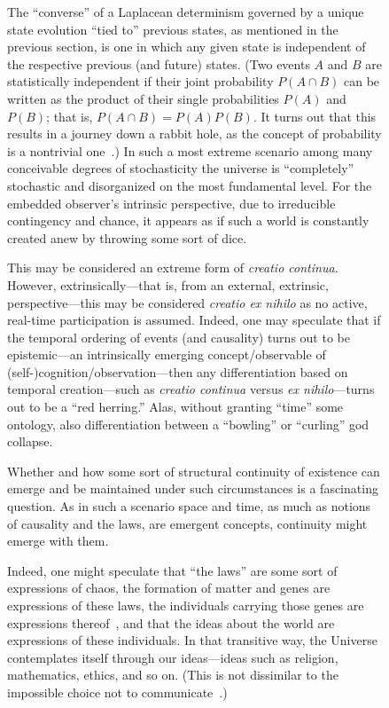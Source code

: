 \documentclass[entropy,article,accept,oneauthor,pdftex]{Definitions/mdpi}
\begin{document}
\begin{figure}[H]
The ``converse'' of a Laplacean determinism governed by a unique state evolution
``tied to'' previous states, as mentioned in the previous section, is one in which any given state is
independent
of the respective previous (and future) states.
(Two events $A$ and $B$
are statistically independent if their joint probability $P(A\cap B)$ can be written
as the product of their single probabilities $P(A)$ and $P(B)$; that is,
$P(A\cap B)= P(A)P(B)$.
It turns out that this results in a journey down a rabbit hole, as the concept of probability
is a nontrivial one~\cite{Uffink2011-UFFSPS}.)
In such a most extreme scenario among many conceivable
degrees of stochasticity
the universe is ``completely'' stochastic and disorganized on the most fundamental level.
For the embedded observer's intrinsic perspective, due to irreducible contingency and chance,
it appears as if such a world is constantly created anew by throwing some sort of
dice.

This may be considered an extreme form of {\it creatio continua.}
However, extrinsically---that is, from an external, extrinsic, perspective---this may be considered {\it creatio ex nihilo} as
no active, real-time participation is assumed.
Indeed, one may speculate that
if the temporal ordering of events (and causality) turns out to be epistemic---an intrinsically emerging concept/observable of  (self-)cognition/observation---then any differentiation
based on temporal creation---such as {\it creatio continua} versus {\it ex nihilo}---turns out to be a ``red herring.''
Alas, without granting ``time'' some ontology, also differentiation between a ``bowling'' or ``curling'' god collapse.\label{2019-cob-lcc-cen}

Whether and how some sort of structural continuity of existence can emerge and be maintained under such circumstances is a fascinating question.
As in such a scenario space and time, as much as notions of causality and the laws, are emergent concepts, continuity might emerge with them.

Indeed, one might speculate that ``the laws'' are some sort of
expressions of chaos, the formation of matter and genes are expressions of these laws,
the individuals carrying those genes are expressions thereof~\cite{Hamilton-1963}, and that the ideas about the world are expressions of these individuals.
In that transitive way, the Universe contemplates itself through our ideas---ideas such as religion, mathematics, ethics, and so on.
(This is not dissimilar to the
impossible choice not to communicate~\cite{Watzlawick-1967}.)


\end{figure}
\end{document}
